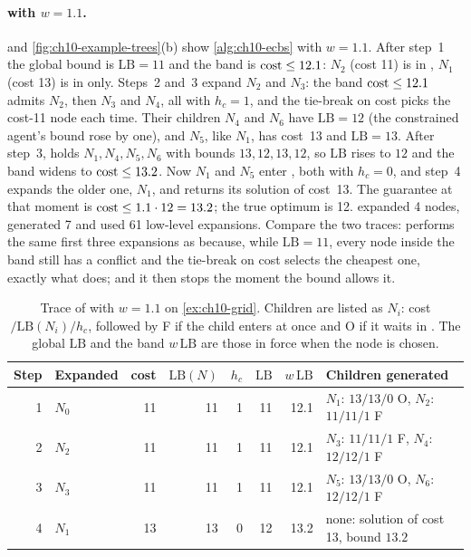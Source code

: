 \paragraph{\ecbs with $w = 1.1$.}
 and \cref{fig:ch10-example-trees}(b) show
\cref{alg:ch10-ecbs} with $w = 1.1$. After step~1 the global bound is
$\mathrm{LB} = 11$ and the band is $\operatorname{cost} \le 12.1$: $N_2$ (cost 11) is in
\Focal, $N_1$ (cost 13) is in \Open only. Steps~2 and~3 expand $N_2$ and
$N_3$: the band $\operatorname{cost} \le 12.1$ admits $N_2$, then $N_3$ and $N_4$, all with
$h_c = 1$, and the tie-break on cost picks the cost-11 node each time. Their
children $N_4$ and $N_6$ have $\mathrm{LB} = 12$ (the constrained
agent's bound rose by one), and $N_5$, like $N_1$, has cost~13 and
$\mathrm{LB} = 13$. After step~3, \Open holds $N_1, N_4, N_5, N_6$ with
bounds $13, 12, 13, 12$, so $\mathrm{LB}$ rises to $12$ and the band widens
to $\operatorname{cost} \le 13.2$. Now $N_1$ and $N_5$ enter \Focal, both with $h_c = 0$,
and step~4 expands the older one, $N_1$, and returns its solution of cost~13.
The guarantee at that moment is $\operatorname{cost} \le 1.1 \cdot 12 = 13.2$; the true
optimum is 12. \ecbs expanded 4 nodes, generated 7 and used 61 low-level
expansions. Compare the two traces: \ecbs performs the same first three
expansions as \cbs because, while $\mathrm{LB} = 11$, every node inside the
band still has a conflict and the tie-break on cost selects the cheapest one,
exactly what \cbs does; and it then stops the moment the bound allows it.

\begin{table}[tb]
  \centering\small
  \caption{Trace of \ecbs with $w = 1.1$ on \cref{ex:ch10-grid}. Children
  are listed as $N_i$: cost$/\mathrm{LB}(N_i)/h_c$, followed by F if the
  child enters \Focal at once and O if it waits in \Open. The global
  $\mathrm{LB}$ and the band $w\,\mathrm{LB}$ are those in force when the
  node is chosen.}
  \label{tab:ch10-ecbs-trace}
  \begin{tabular}{@{}rlrrrrrl@{}}
  \toprule
  Step & Expanded & cost & $\mathrm{LB}(N)$ & $h_c$ & $\mathrm{LB}$ & $w\,\mathrm{LB}$ & Children generated\\
  \midrule
  1 & $N_0$ & 11 & 11 & 1 & 11 & 12.1 & $N_1$: $13/13/0$ O, $N_2$: $11/11/1$ F\\
  2 & $N_2$ & 11 & 11 & 1 & 11 & 12.1 & $N_3$: $11/11/1$ F, $N_4$: $12/12/1$ F\\
  3 & $N_3$ & 11 & 11 & 1 & 11 & 12.1 & $N_5$: $13/13/0$ O, $N_6$: $12/12/1$ F\\
  4 & $N_1$ & 13 & 13 & 0 & 12 & 13.2 & none: solution of cost 13, bound $13.2$\\
  \bottomrule
  \end{tabular}
\end{table}


